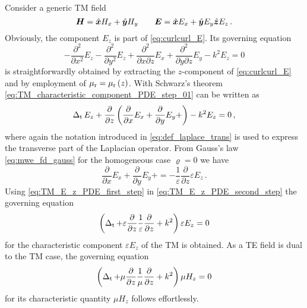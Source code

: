 Consider a generic \ac{TM} field
\begin{equation}\label{eq:generic_TM_field_components}
	\pvec{H} = \uv{x}H_x + \uv{y}H_y 
	\qquad
	\pvec{E} = \uv{x}E_x + \uv{y}E_y \uv{z}E_z
	\, .
\end{equation}
Obviously, the component $E_z$ is part of \eqref{eq:curlcurl_E}.
Its governing equation
\begin{equation}\label{eq:TM_characteristic_component_PDE_step_01}
	-\frac{\partial^2}{\partial x^2} E_z
	-\frac{\partial^2}{\partial y^2} E_z
	+\frac{\partial^2}{\partial x \partial z} E_x
	+\frac{\partial^2}{\partial y \partial z} E_y
	-k^2 E_z
	= 0
\end{equation}
is straightforwardly obtained by extracting the $z$-component of
\eqref{eq:curlcurl_E} and by employment of $\mu_{\mathrm{r}} = \mu_{\mathrm{r}}\left(z\right)$.
With Schwarz's theorem \eqref{eq:TM_characteristic_component_PDE_step_01} can
be written as
\begin{equation}\label{eq:TM_E_z_PDE_first_step}
	\operatorname{\operatorname{\Delta}_\mathrm{t}} E_z
	+
	\frac{\partial}{\partial z}
	\left(
		\frac{\partial}{\partial x} E_x + 
		\frac{\partial}{\partial y} E_y + 
	\right)
	-
	k^2 E_z
	=
	0
	\, ,
\end{equation}
where again the notation introduced in \eqref{eq:def_laplace_trans} is used to
express the transverse part of the Laplacian operator.
From Gauss's law \eqref{eq:mwe_fd_gauss} for the homogeneous case $\varrho = 0$
we have
\begin{equation}\label{eq:TM_E_z_PDE_second_step}
	\frac{\partial}{\partial x} E_x + 
	\frac{\partial}{\partial y} E_y + 
	=
	-
	\frac{1}{\varepsilon}
	\frac{\partial}{\partial z}
	\varepsilon E_z
	\, .
\end{equation}
Using \eqref{eq:TM_E_z_PDE_first_step} in \eqref{eq:TM_E_z_PDE_second_step}
the governing equation
\begin{equation}\label{eq:TM_characteristic_component_PDE}
	\left(
		\operatorname{\operatorname{\Delta}_\mathrm{t}} 
		+
		\varepsilon
		\frac{\partial}{\partial z}
		\frac{1}{\varepsilon}
		\frac{\partial}{\partial z}
		+
		k^2
	\right)
	\varepsilon E_z = 0
\end{equation}
for the characteristic component $\varepsilon E_z$ of the \ac{TM} is obtained.
As a \ac{TE} field is dual to the \ac{TM} case, the governing equation
\begin{equation}\label{eq:TE_characteristic_component_PDE}
	\left(
		\operatorname{\operatorname{\Delta}_\mathrm{t}} 
		+
		\mu
		\frac{\partial}{\partial z}
		\frac{1}{\mu}
		\frac{\partial}{\partial z}
		+
		k^2
	\right)
	\mu H_z = 0
\end{equation}
for its characteristic quantity $\mu H_z$ follows effortlessly. 

